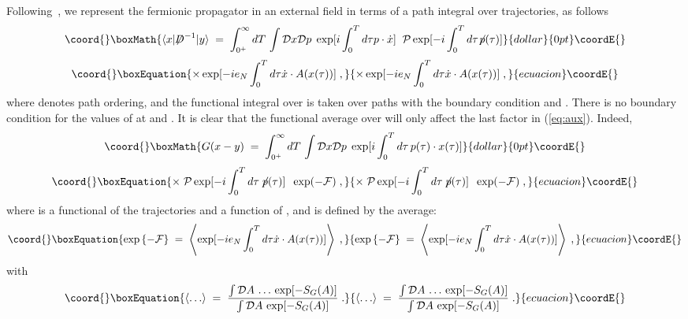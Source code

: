 \documentclass[12pt,a4paper]{article} \usepackage[latin1] {inputenc}
\begin{document}
Following~\cite{Karanikas:1995zi}, we represent the fermionic
propagator in an external field in terms of a path integral over
trajectories, as follows
$$\coord{}\boxMath{
\langle x| {\not \!\! D}^{-1}|y \rangle \;=\; \int_{0^+}^\infty dT
\, \int {\mathcal D}x {\mathcal D}p \; \exp[i \int_0^T d\tau p \cdot
{\dot x}] \;\; {\mathcal P} \exp[-i \int_0^T d\tau {\not\!p}(\tau) ]
}{dollar}{0pt}\coordE{}$$
\begin{equation}\coord{}\boxEquation{\label{eq:aux}
\times \exp[- i e_N \int_{0}^T d\tau {\dot x} \cdot A(x(\tau))] \;, 
}{\times \exp[- i e_N \int_{0}^T d\tau {\dot x} \cdot A(x(\tau))] \;, 
}{ecuacion}\coordE{}\end{equation}
where \coordHE{} denotes path ordering, and the functional
integral over \coordHE{} is taken over paths with the boundary condition
\coordHE{} and \coordHE{}. There is no boundary
condition for the values of \coordHE{} at \coordHE{} and \coordHE{}.  It is clear
that the functional average over \coordHE{} will only affect the last factor
in (\ref{eq:aux}). Indeed,
$$\coord{}\boxMath{
G(x-y) \;=\;\int_{0^+}^\infty dT \, \int {\mathcal D}x {\mathcal
  D}p \; \exp[ i \int_0^T d\tau \, p(\tau) \cdot x(\tau) ]
}{dollar}{0pt}\coordE{}$$
\begin{equation}\coord{}\boxEquation{\label{eq:g2}
\times \; {\mathcal P} \exp[ -i \int_0^T d\tau \, {\not \! p}(\tau) ] 
\;\; \exp( -{\mathcal F}) \;,
}{\times \; {\mathcal P} \exp[ -i \int_0^T d\tau \, {\not \! p}(\tau) ] 
\;\; \exp( -{\mathcal F}) \;,
}{ecuacion}\coordE{}\end{equation}
where \coordHE{} is a functional of the trajectories \coordHE{} and
a function of \coordHE{}, and is defined by the average:
\begin{equation}\coord{}\boxEquation{\label{eq:deff}
 \exp\left\{-{\mathcal F}\right\} \;=\; \left\langle 
\exp [- i e_N \int_{0}^T d\tau {\dot x} \cdot A(x(\tau)) ] \right\rangle \;,
}{\exp\left\{-{\mathcal F}\right\} \;=\; \left\langle 
\exp [- i e_N \int_{0}^T d\tau {\dot x} \cdot A(x(\tau)) ] \right\rangle \;,
}{ecuacion}\coordE{}\end{equation}
with
\begin{equation}\coord{}\boxEquation{
\langle \ldots \rangle \;=\; \frac{\int {\mathcal D}A \,
\ldots \, \exp [ - S_G(A) ]}{\int {\mathcal D}A \, \exp [ - S_G(A) ]}
\;.
}{
\langle \ldots \rangle \;=\; \frac{\int {\mathcal D}A \,
\ldots \, \exp [ - S_G(A) ]}{\int {\mathcal D}A \, \exp [ - S_G(A) ]}
\;.
}{ecuacion}\coordE{}\end{equation}
\end{document}
